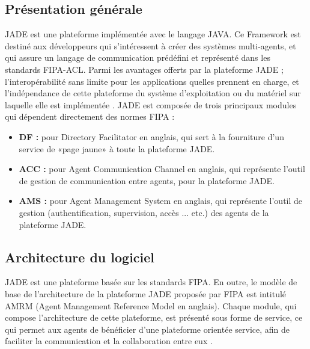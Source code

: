 \subsection{Présentation générale}
JADE est une plateforme implémentée avec le langage JAVA. Ce Framework est destiné aux développeurs qui s’intéressent à créer des systèmes multi-agents, et qui assure un langage de communication prédéfini et représenté dans les standards FIPA-ACL. Parmi les avantages offerts par la plateforme JADE ; l’interopérabilité sans limite pour les applications quelles prennent en charge, et l’indépendance de cette plateforme du système d’exploitation ou du matériel sur laquelle elle est implémentée \cite{36}. JADE est composée de trois principaux modules qui dépendent directement des normes FIPA :
\begin{itemize}
    \item \textbf{DF :} pour Directory Facilitator en anglais, qui sert à la fourniture d’un service de «page jaune» à toute la plateforme JADE.
    \item \textbf{ACC :} pour Agent Communication Channel en anglais, qui représente l’outil de gestion de communication entre agents, pour la plateforme JADE.
    \item \textbf{AMS :} pour Agent Management System en anglais, qui représente l’outil de gestion (authentification, supervision, accès ... etc.) des agents de la plateforme JADE.

\end{itemize}
\subsection{Architecture du logiciel}
JADE est une plateforme basée sur les standards FIPA. En outre, le modèle de base de l’architecture de la plateforme JADE proposée par FIPA est intitulé AMRM (Agent Management Reference Model en anglais). Chaque module, qui compose l’architecture de cette plateforme, est présenté sous forme de service, ce qui permet aux agents de bénéficier d’une plateforme orientée service, afin de faciliter la communication et la collaboration entre eux \cite{37}.


